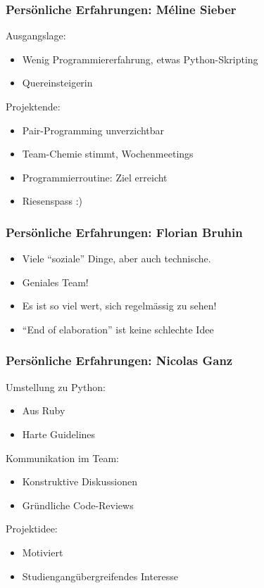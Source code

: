\documentclass{beamer}
\begin{document}
	\begin{frame}
	  	\frametitle{Persönliche Erfahrungen: Méline Sieber}
	  	Ausgangslage: 
		\begin{itemize}
			\item Wenig Programmiererfahrung, etwas Python-Skripting
			\item Quereinsteigerin
		\end{itemize}
		\pause
		Projektende:
			\begin{itemize}
				\item Pair-Programming unverzichtbar
				\item Team-Chemie stimmt, Wochenmeetings
				\item Programmierroutine: Ziel erreicht
				\item Riesenspass :)
			\end{itemize}
	\end{frame}
	
	\begin{frame}
	   	\frametitle{Persönliche Erfahrungen: Florian Bruhin}
      \begin{itemize}
        \item Viele ``soziale'' Dinge, aber auch technische.
        \item Geniales Team!
        \item Es ist so viel wert, sich regelmässig zu sehen!
        \item ``End of elaboration'' ist keine schlechte Idee
      \end{itemize}
	\end{frame}

  \begin{frame}
    \frametitle{Persönliche Erfahrungen: Nicolas Ganz}

    Umstellung zu Python:
    \begin{itemize}
      \item Aus Ruby
      \item Harte Guidelines
    \end{itemize}

    \pause
    Kommunikation im Team:
    \begin{itemize}
      \item Konstruktive Diskussionen
      \item Gründliche Code-Reviews
    \end{itemize}

    \pause
    Projektidee:
    \begin{itemize}
      \item Motiviert
      \item Studiengangübergreifendes Interesse
    \end{itemize}
  \end{frame}
\end{document}
